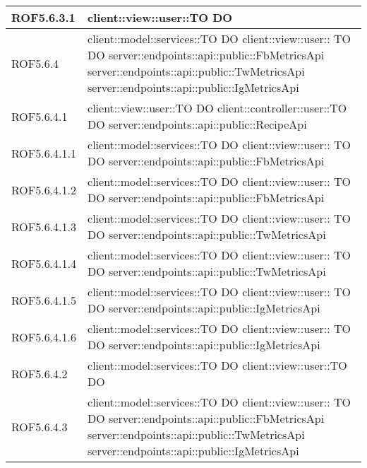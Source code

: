 \begin{center}
\begin{longtable}{| p{2.5cm} | p{11cm} |}
\hline
ROF5.6.3.1 & client::view::user::TO DO \\
\hline
ROF5.6.4 & client::model::services::TO DO \newline client::view::user:: TO DO \newline server::endpoints::api::public::FbMetricsApi \newline server::endpoints::api::public::TwMetricsApi \newline server::endpoints::api::public::IgMetricsApi \\
\hline
ROF5.6.4.1 & client::view::user::TO DO \newline client::controller::user::TO DO \newline server::endpoints::api::public::RecipeApi \\
\hline
ROF5.6.4.1.1 & client::model::services::TO DO \newline client::view::user:: TO DO \newline server::endpoints::api::public::FbMetricsApi \\
\hline
ROF5.6.4.1.2 & client::model::services::TO DO \newline client::view::user:: TO DO \newline server::endpoints::api::public::FbMetricsApi \\
\hline
ROF5.6.4.1.3 & client::model::services::TO DO \newline client::view::user:: TO DO \newline server::endpoints::api::public::TwMetricsApi \\
\hline
ROF5.6.4.1.4 & client::model::services::TO DO \newline client::view::user:: TO DO \newline server::endpoints::api::public::TwMetricsApi \\
\hline
ROF5.6.4.1.5 & client::model::services::TO DO \newline client::view::user:: TO DO \newline server::endpoints::api::public::IgMetricsApi \\
\hline
ROF5.6.4.1.6 & client::model::services::TO DO \newline client::view::user:: TO DO \newline server::endpoints::api::public::IgMetricsApi \\
\hline
ROF5.6.4.2 & client::model::services::TO DO \newline client::view::user::TO DO\\
\hline
ROF5.6.4.3 & client::model::services::TO DO \newline client::view::user:: TO DO \newline server::endpoints::api::public::FbMetricsApi \newline server::endpoints::api::public::TwMetricsApi \newline server::endpoints::api::public::IgMetricsApi \\

\end{longtable}
\end{center}
